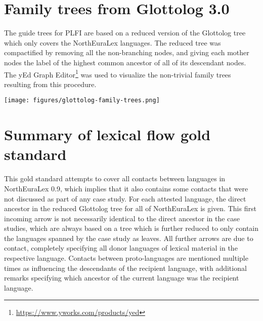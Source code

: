 \section{Family trees from Glottolog 3.0}
The guide trees for PLFI are based on a reduced version of the Glottolog tree which only covers the NorthEuraLex languages. The reduced tree was compactified by removing all the non-branching nodes, and giving each mother nodes the label of the highest common ancestor of all of its descendant nodes. The yEd Graph Editor\footnote{\url{https://www.yworks.com/products/yed}} was used to visualize the non-trivial family trees resulting from this procedure.

\begin{center}
 \texttt{[image: figures/glottolog-family-trees.png]}
 \addtocounter{table}{-1} 
\end{center}

\newpage

\section{Summary of lexical flow gold standard}
This gold standard attempts to cover all contacts between languages in North\-Eu\-ra\-Lex 0.9, which implies that it also contains some contacts that were not discussed as part of any case study. For each attested language, the direct ancestor in the reduced Glottolog tree for all of NorthEuraLex is given. This first incoming arrow is not necessarily identical to the direct ancestor in the case studies, which are always based on a tree which is further reduced to only contain the languages spanned by the case study as leaves. All further arrows are due to contact, completely specifying all donor languages of lexical material in the respective language. Contacts between proto-languages are mentioned multiple times as influencing the descendants of the recipient language, with additional remarks specifying which ancestor of the current language was the recipient language.

